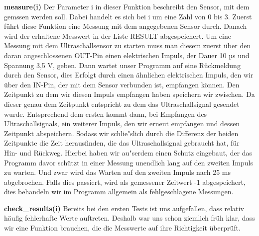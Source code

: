 \documentclass[a4paper,12pt]{article}
\begin{document}
\textbf{measure(i)}
\newline
Der Parameter i in dieser Funktion beschreibt den Sensor, mit dem gemssen werden soll. Dabei handelt es sich bei i um
eine Zahl von 0 bis 3. Zuerst f\"uhrt diese Funktion eine Messung mit dem angegebenen Sensor durch. Danach wird der
erhaltene Messwert in der Liste RESULT abgespeichert. Um eine Messung mit dem Ultraschallsensor zu starten muss man
diesem zuerst \"uber den daran angeschlossenen OUT-Pin einen elektrischen Impuls, der Dauer 10 µs und Spannung 3,5 V, 
geben. Dann wartet unser Programm auf eine R\"uckmeldung durch den Sensor, dies Erfolgt durch einen \"ahnlichen
elektrischen Impuls, den wir \"uber den IN-Pin, der mit dem Sensor verbunden ist, empfangen k\"onnen. Den Zeitpunkt zu
dem wir diesen Impuls empfangen haben speichern wir zwischen. Da dieser genau dem Zeitpunkt entspricht zu dem das
Ultraschallsignal gesendet wurde. Entsprechend dem ersten kommt dann, bei Empfangen des Ultraschallsignals, ein weiterer
Impuls, den wir erneut empfangen und dessen Zeitpunkt abspeichern. Sodass wir schlie"slich durch die Differenz der
beiden Zeitpunkte die Zeit herausfinden, die das Ultraschallsignal gebraucht hat, f\"ur Hin- und R\"uckweg. Hierbei
haben wir au"serdem einen Schutz eingebaut, der das Programm davor sch\"utzt in einer Messung unendlich lang auf den
zweiten Impuls zu warten. Und zwar wird das Warten auf den zweiten Impuls nach 25 ms abgebrochen. Falls dies passiert,
wird als gemessener Zeitwert -1 abgespeichert, dies behandeln wir im Programm allgemein als fehlgeschlagene Messungen.

\medskip

\textbf{check\_results(i)}
\newline
Bereits bei den ersten Tests ist uns aufgefallen, dass relativ h\"aufig fehlerhafte Werte auftreten. Deshalb war uns
schon ziemlich fr\"uh klar, dass wir eine Funktion brauchen, die die Messwerte auf ihre Richtigkeit \"uberpr\"uft.
\end{document}
